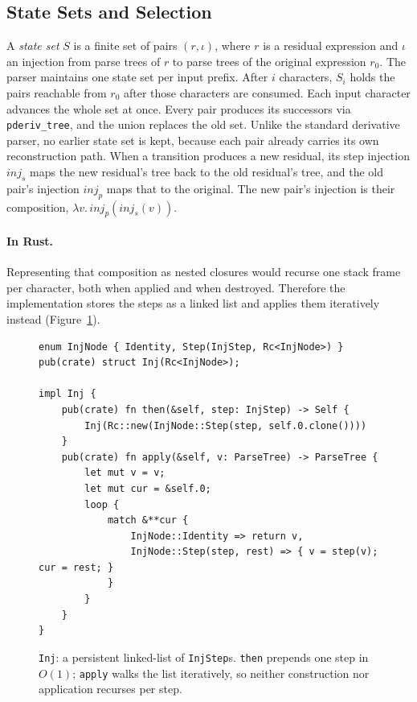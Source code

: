 %
%
%

\subsection{State Sets and Selection}
\label{sec:pderiv-state-set}

A \emph{state set} $S$ is a finite set of pairs $(r, \iota)$, 
where $r$ is a residual expression and $\iota$ an injection 
from parse trees of $r$ to parse trees of the original expression $r_0$. 
The parser maintains one state set per input prefix.
After $i$ characters, $S_i$ holds the pairs reachable from $r_0$ 
after those characters are consumed.
Each input character advances the whole set at once. 
Every pair produces its successors via \texttt{pderiv\_tree}, 
and the union replaces the old set. 
Unlike the standard derivative parser, no earlier state set is kept,
because each pair already carries its own reconstruction path.
When a transition produces a new residual, 
its step injection $\mathit{inj}_s$ 
maps the new residual's tree back to the old residual's tree, 
and the old pair's injection $\mathit{inj}_p$ 
maps that to the original. 
The new pair's injection is their composition,
$\lambda v.\, \mathit{inj}_p(\mathit{inj}_s(v))$.

%

\paragraph{In Rust.}
Representing that composition as nested closures 
would recurse one stack frame per character, 
both when applied and when destroyed. 
Therefore the implementation stores the steps 
as a linked list and applies them iteratively instead (Figure~\ref{fig:inj-rust}).
\begin{figure}[H]
\small
\begin{verbatim}
enum InjNode { Identity, Step(InjStep, Rc<InjNode>) }
pub(crate) struct Inj(Rc<InjNode>);

impl Inj {
    pub(crate) fn then(&self, step: InjStep) -> Self {
        Inj(Rc::new(InjNode::Step(step, self.0.clone())))
    }
    pub(crate) fn apply(&self, v: ParseTree) -> ParseTree {
        let mut v = v;
        let mut cur = &self.0;
        loop {
            match &**cur {
                InjNode::Identity => return v,
                InjNode::Step(step, rest) => { v = step(v); cur = rest; }
            }
        }
    }
}
\end{verbatim}
\caption{\texttt{Inj}: a persistent linked-list of \texttt{InjStep}s.
\texttt{then} prepends one step in $O(1)$; \texttt{apply} walks the list
iteratively, so neither construction nor application recurses per step.}
\label{fig:inj-rust}
\end{figure}

